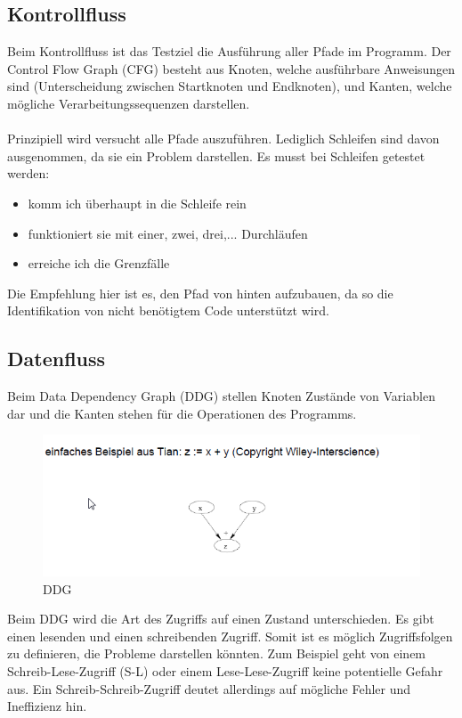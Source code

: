 \subsection{Kontrollfluss}
Beim Kontrollfluss ist das Testziel die Ausführung aller Pfade im Programm. Der Control Flow Graph (CFG) besteht aus Knoten, welche ausführbare Anweisungen sind (Unterscheidung zwischen Startknoten und Endknoten), und Kanten, welche mögliche Verarbeitungssequenzen darstellen. 
\\\\
Prinzipiell wird versucht alle Pfade auszuführen. Lediglich Schleifen sind davon ausgenommen, da sie ein Problem darstellen. Es musst bei Schleifen getestet werden:
\begin{itemize}
\item komm ich überhaupt in die Schleife rein
\item funktioniert sie mit einer, zwei, drei,... Durchläufen
\item erreiche ich die Grenzfälle
\end{itemize}

Die Empfehlung hier ist es, den Pfad von hinten aufzubauen, da so die Identifikation von nicht benötigtem Code unterstützt wird.

\subsection{Datenfluss}
Beim Data Dependency Graph (DDG) stellen Knoten Zustände von Variablen dar und die Kanten stehen für die Operationen des Programms. 
\begin{figure}[hbtp]
\centering
\includegraphics[scale=0.8]{document/graphics/DDG} 
\caption{DDG}
\end{figure}

Beim DDG wird die Art des Zugriffs auf einen Zustand unterschieden. Es gibt einen lesenden und einen schreibenden Zugriff. Somit ist es möglich Zugriffsfolgen zu definieren, die Probleme darstellen könnten. Zum Beispiel geht von einem Schreib-Lese-Zugriff (S-L) oder einem Lese-Lese-Zugriff keine potentielle Gefahr aus. Ein Schreib-Schreib-Zugriff deutet allerdings auf mögliche Fehler und Ineffizienz hin. 

